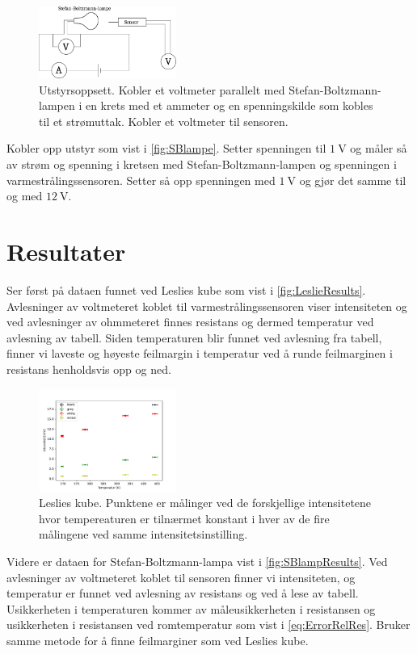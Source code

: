 \begin{figure}
  \centering
  \includegraphics[width=0.4\textwidth]{figures/lampe.pdf}
  \caption{Utstyrsoppsett. Kobler et voltmeter parallelt med Stefan-Boltzmann-lampen i en krets med et ammeter og en spenningskilde som kobles til et strømuttak. Kobler et voltmeter til sensoren.}
  \label{fig:SBlampe}
\end{figure}

Kobler opp utstyr som vist i \autoref{fig:SBlampe}. Setter spenningen til $\SI{1}{\volt}$ og måler så av strøm og spenning i kretsen med Stefan-Boltzmann-lampen og spenningen i varmestrålingssensoren. Setter så opp spenningen med $\SI{1}{\volt}$ og gjør det samme til og med $\SI{12}{\volt}$.


\section{Resultater}
Ser først på dataen funnet ved Leslies kube som vist i \autoref{fig:LeslieResults}. Avlesninger av voltmeteret koblet til varmestrålingssensoren viser intensiteten og ved avlesninger av ohmmeteret finnes resistans og dermed temperatur ved avlesning av tabell. Siden temperaturen blir funnet ved avlesning fra tabell, finner vi laveste og høyeste feilmargin i temperatur ved å runde feilmarginen i resistans henholdsvis opp og ned.
\begin{figure}
  \centering
  \includegraphics[width=0.4\textwidth]{../code/LC.pdf}
  \caption{Leslies kube. Punktene er målinger ved de forskjellige intensitetene hvor tempereaturen er tilnærmet konstant i hver av de fire målingene ved samme intensitetsinstilling.}
  \label{fig:LeslieResults}
\end{figure}

Videre er dataen for Stefan-Boltzmann-lampa vist i \autoref{fig:SBlampResults}. Ved avlesninger av voltmeteret koblet til sensoren finner vi intensiteten, og temperatur er funnet ved avlesning av resistans og ved å lese av tabell. Usikkerheten i temperaturen kommer av måleusikkerheten i resistansen og usikkerheten i resistansen ved romtemperatur som vist i \eqref{eq:ErrorRelRes}. Bruker samme metode for å finne feilmarginer som ved Leslies kube.

